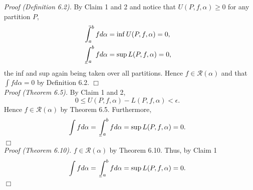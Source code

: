 \documentclass{article}
\def\upint{\mathchoice%
    {\mkern13mu\overline{\vphantom{\intop}\mkern7mu}\mkern-20mu}%
    {\mkern7mu\overline{\vphantom{\intop}\mkern7mu}\mkern-14mu}%
    {\mkern7mu\overline{\vphantom{\intop}\mkern7mu}\mkern-14mu}%
    {\mkern7mu\overline{\vphantom{\intop}\mkern7mu}\mkern-14mu}%
  \int}
\def\lowint{\mkern3mu\underline{\vphantom{\intop}\mkern7mu}\mkern-10mu\int}
\begin{document}
\emph{Proof (Definition 6.2).}
By Claim 1 and 2 and notice that $U(P, f, \alpha) \geq 0$ for any partition $P$,
\begin{align*}
\upint_a^b f d\alpha &= \inf U(P, f, \alpha) = 0, \\
\lowint_a^b f d\alpha &= \sup L(P, f, \alpha) = 0,
\end{align*}
the inf and sup again being taken over all partitions.
Hence $f \in \mathscr{R}(\alpha)$ and that $\int f d \alpha = 0$ by Definition 6.2.
$\Box$ \\

\emph{Proof (Theorem 6.5).}
By Claim 1 and 2,
$$0 \leq U(P, f, \alpha) - L(P, f, \alpha) < \epsilon.$$
Hence $f \in \mathscr{R}(\alpha)$ by Theorem 6.5.
Furthermore,
$$\int f d \alpha = \lowint_a^b f d\alpha = \sup L(P, f, \alpha) = 0.$$
$\Box$ \\

\emph{Proof (Theorem 6.10).}
$f \in \mathscr{R}(\alpha)$ by Theorem 6.10.
Thus, by Claim 1
$$\int f d \alpha = \lowint_a^b f d\alpha = \sup L(P, f, \alpha) = 0.$$
$\Box$ \\
\end{document}
